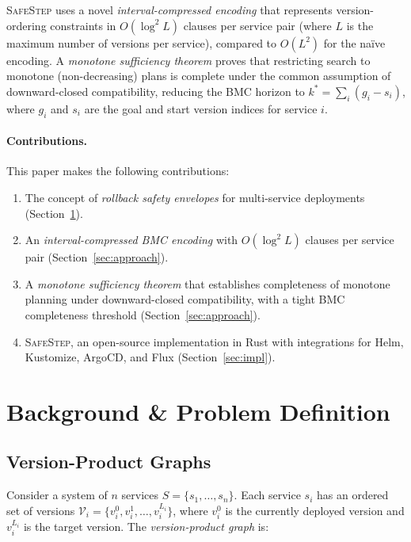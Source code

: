 \documentclass[10pt,twocolumn]{article}
\newcommand{\safestep}{\textsc{SafeStep}}
\begin{document}
\safestep{} uses a novel \emph{interval-compressed encoding}
that represents version-ordering constraints in $O(\log^{2} L)$
clauses per service pair (where $L$ is the maximum number of
versions per service), compared to $O(L^{2})$ for the na\"ive
encoding. A \emph{monotone sufficiency theorem} proves that
restricting search to monotone (non-decreasing) plans is complete
under the common assumption of downward-closed compatibility,
reducing the BMC horizon to $k^{*} = \sum_{i}(g_{i} - s_{i})$,
where $g_{i}$ and $s_{i}$ are the goal and start version indices
for service $i$.

\paragraph{Contributions.}
This paper makes the following contributions:
\begin{enumerate}[leftmargin=*,nosep]
  \item The concept of \emph{rollback safety envelopes} for
        multi-service deployments (Section~\ref{sec:problem}).
  \item An \emph{interval-compressed BMC encoding} with
        $O(\log^{2} L)$ clauses per service pair
        (Section~\ref{sec:approach}).
  \item A \emph{monotone sufficiency theorem} that establishes
        completeness of monotone planning under downward-closed
        compatibility, with a tight BMC completeness threshold
        (Section~\ref{sec:approach}).
  \item \safestep{}, an open-source implementation in Rust
        with integrations for Helm, Kustomize, ArgoCD, and Flux
        (Section~\ref{sec:impl}).
\end{enumerate}

\section{Background \& Problem Definition}
\label{sec:problem}

\subsection{Version-Product Graphs}

Consider a system of $n$ services $S = \{s_1, \ldots, s_n\}$.
Each service $s_i$ has an ordered set of versions
$\mathcal{V}_i = \{v_i^0, v_i^1, \ldots, v_i^{L_i}\}$,
where $v_i^0$ is the currently deployed version and $v_i^{L_i}$
is the target version. The \emph{version-product graph} is:
\end{document}
